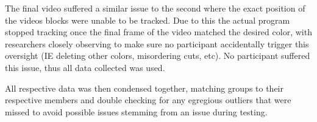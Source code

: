 \documentclass[manuscript, review]{acmart}
\begin{document}
The final video suffered a similar issue to the second where the exact position of the videos blocks were unable to be tracked. Due to this the actual program stopped tracking once the final frame of the video matched the desired color, with researchers closely observing to make sure no participant accidentally trigger this oversight (IE deleting other colors, misordering cuts, etc). No participant suffered this issue, thus all data collected was used.

All respective data was then condensed together, matching groups to their respective members and double checking for any egregious outliers that were missed to avoid possible issues stemming from an issue during testing.





\appendix
\end{document}
